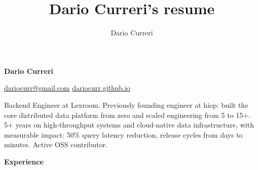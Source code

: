 \documentclass[10pt,letterpaper]{article}
\author{Dario Curreri}
\title{Dario Curreri's resume}
\begin{document}
\makeatletter
\def\Hy@colorlink#1{\begingroup\fontshape{it}\selectfont}%
\makeatother
\begin{justify}
      \begin{LARGE}
            \textbf{Dario Curreri}
      \end{LARGE}
      \hspace{0.5cm}
      \href{mailto:dariocurr@gmail.com}{dariocurr@gmail.com}
      \hspace{0.5cm}
      \href{https://dariocurr.github.io/}{dariocurr.github.io}
      \hfill
      \href{https://github.com/dariocurr/}{\Large{\faGithub}}
      \hspace{0.3cm}
      \href{https://www.linkedin.com/in/dariocurr}{\Large{\faLinkedinIn}}
      \hspace{0.3cm}
      \href{https://scholar.google.it/citations?user=DhJKkeMAAAAJ}{\Large{\faGraduationCap}}

      \vspace{0.2cm}
      Backend Engineer at Lexroom.
      Previously founding engineer at hiop: built the core distributed data platform from zero and scaled engineering from 5 to 15+.
      5+ years on high-throughput systems and cloud-native data infrastructure, with measurable impact: 50\% query latency reduction, release cycles from days to minutes.
      Active OSS contributor.

      \vspace{0.15cm}
      {\Large \textbf{Experience} \strut}


\end{justify}
\end{document}
